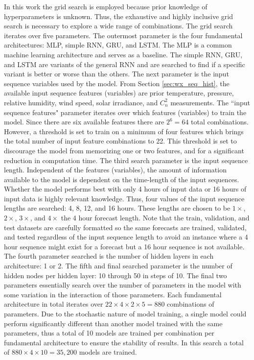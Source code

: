 In this work the grid search is employed because prior knowledge of hyperparameters is unknown. Thus, the exhaustive and highly inclusive grid search is necessary to explore a wide range of combinations. The grid search iterates over five parameters. The outermost parameter is the four fundamental architectures: MLP, simple RNN, GRU, and LSTM. The MLP is a common machine learning architecture and serves as a baseline. The simple RNN, GRU, and LSTM are variants of the general RNN and are searched to find if a specific variant is better or worse than the others. The next parameter is the input sequence variables used by the model. From Section \ref{sec:wx_seq_hist}, the available input sequence features (variables) are prior temperature, pressure, relative humidity, wind speed, solar irradiance, and $C_{n}^{2}$ measurements. The ``input sequence features" parameter iterates over which features (variables) to train the model. Since there are six available features there are $2^6 = 64$ total combinations. However, a threshold is set to train on a minimum of four features which brings the total number of input feature combinations to 22. This threshold is set to discourage the model from memorizing one or two features, and for a significant reduction in computation time. The third search parameter is the input sequence length. Independent of the features (variables), the amount of information available to the model is dependent on the time-length of the input sequences. Whether the model performs best with only 4 hours of input data or 16 hours of input data is highly relevant knowledge. Thus, four values of the input sequence lengths are searched: 4, 8, 12, and 16 hours. These lengths are chosen to be $1\times$, $2\times$, $3\times$, and $4\times$ the 4 hour forecast length. Note that the train, validation, and test datasets are carefully formatted so the same forecasts are trained, validated, and tested regardless of the input sequence length to avoid an instance where a 4 hour sequence might exist for a forecast but a 16 hour sequence is not available. The fourth parameter searched is the number of hidden layers in each architecture: 1 or 2. The fifth and final searched parameter is the number of hidden nodes per hidden layer: 10 through 50 in steps of 10. The final two parameters essentially search over the number of parameters in the model with some variation in the interaction of those parameters. Each fundamental architecture in total iterates over $22 \times 4 \times 2 \times 5 = 880$ combinations of parameters. Due to the stochastic nature of model training, a single model could perform significantly different than another model trained with the same parameters, thus a total of 10 models are trained per combination per fundamental architecture to ensure the stability of results. In this search a total of $880 \times 4 \times 10 = 35,200$ models are trained.


